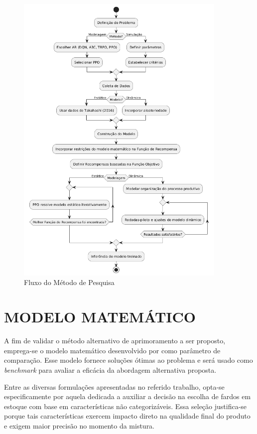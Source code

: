 \documentclass[
    12pt,                %
    openright,           %
    oneside,             %
    a4paper,             %
    english,             %
    spanish,             %
    brazil               %
]{ufscar}
\begin{document}
\begin{figure}[hbt]
\centering
  \caption{Fluxo do Método de Pesquisa}
  \label{figure:MetodoPesquisa}
  \includegraphics[width=0.9\textwidth]{figures/Metodo de pesquisa.png}
\end{figure}

\chapter{MODELO MATEMÁTICO}

A fim de validar o método alternativo de aprimoramento a ser proposto, emprega-se o modelo matemático desenvolvido por  como parâmetro de comparação. Esse modelo fornece soluções ótimas ao problema e será usado como \textit{benchmark} para avaliar a eficácia da abordagem alternativa proposta.

Entre as diversas formulações apresentadas no referido trabalho, opta-se especificamente por aquela dedicada a auxiliar a decisão na escolha de fardos em estoque com base em características não categorizáveis. Essa seleção justifica-se porque tais características exercem impacto direto na qualidade final do produto e exigem maior precisão no momento da mistura.
\end{document}
